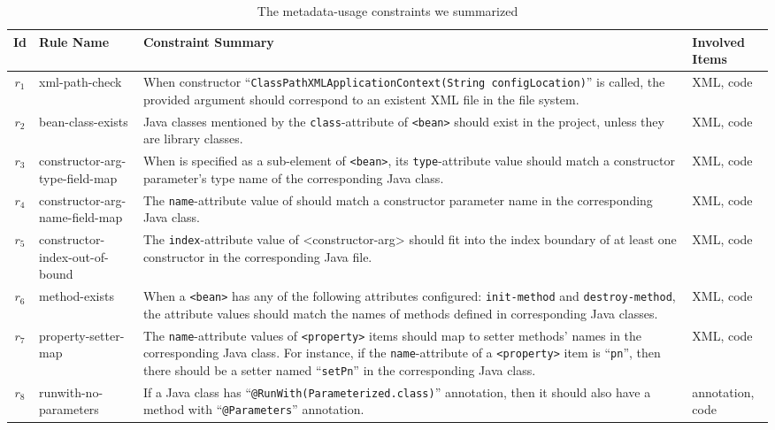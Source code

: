 \vspace{-.5em}
\begin{table}[h]
\centering
\footnotesize
\caption{The \totalRule metadata-usage constraints we summarized}\label{tab:constraints}
  \vspace{-1.5em}
\begin{tabular}{|c|p{1.5cm}|p{8cm}|p{1.5cm}|}
\hline
\textbf{Id} & \textbf{Rule Name} & \textbf{Constraint Summary} & \textbf{Involved Items} \\
\hline
$r_1$ & xml-path-check & When constructor ``{\tt ClassPathXMLApplicationContext(String configLocation)}'' is called, the provided argument should correspond to an existent XML file in the file system. &XML, code \\
\hline
$r_2$ & bean-class-exists & Java classes mentioned by the {\tt class}-attribute of {\tt <bean>} should exist in the project, unless they are library classes. & XML, code \\
\hline
$r_3$ & constructor-arg-type-field-map & When {\tt <constructor-arg>} is specified as a sub-element of {\tt <bean>}, its {\tt type}-attribute value should match a {constructor parameter}'s type name of the corresponding Java class.&XML, code \\
\hline
$r_4$ & constructor-arg-name-field-map & The {\tt name}-attribute value of {\tt <constructor-arg>} should match a {constructor parameter} name in the corresponding Java class.& XML, code \\
\hline
$r_5$ & constructor-index-out-of-bound & The {\tt index}-attribute value of {<constructor-arg>} should fit into the index boundary of at least one constructor in the corresponding Java file. & XML, code \\
\hline
$r_6$ & method-exists & When a {\tt <bean>} has any of the following attributes configured: {\tt init-method} and {\tt destroy-method}, the attribute values should match the names of methods defined in corresponding Java classes. &XML, code \\
\hline
$r_7$ & property-setter-map & The {\tt name}-attribute values of {\tt <property>} items should map to setter methods' names in the corresponding Java class. For instance, if the {\tt name}-attribute of a {\tt <property>} item is ``{\tt pn}'', then there should be a setter named ``{\tt setPn}'' in the corresponding Java class. & XML, code \\
\hline
$r_{8}$ & runwith-no-parameters & If a Java class has ``{\tt @RunWith(Parameterized.class)}'' annotation, then it should also have a method with ``{\tt @Parameters}'' annotation. & annotation, code\\

\end{tabular}
\end{table}
